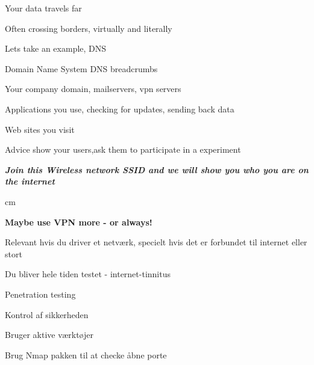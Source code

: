 \documentclass[Screen16to9,17pt]{foils}
\begin{document}



\begin{list2}
\item Your data travels far
\item Often crossing borders, virtually and literally
\end{list2}



\begin{list1}
\item Lets take an example, DNS
\item Domain Name System DNS breadcrumbs
\begin{list2}
\item Your company domain, mailservers, vpn servers
\item Applications you use, checking for updates, sending back data
\item Web sites you visit
\end{list2}
\vskip 1cm
\item Advice show your users,ask them to participate in a experiment
\end{list1}

\emph{\bf Join this Wireless network SSID and we will show you who you are on the internet}

 cm
\centerline{\bf\Large Maybe use VPN more - or always!}





\begin{list2}
\item Relevant hvis du driver et netværk, specielt hvis det er forbundet til internet eller stort
\item Du bliver hele tiden testet - internet-tinnitus
\end{list2}


\begin{list1}
\item Penetration testing
\item Kontrol af sikkerheden
\item Bruger aktive værktøjer
\item Brug Nmap pakken til at checke åbne porte
\end{list1}
\end{document}
